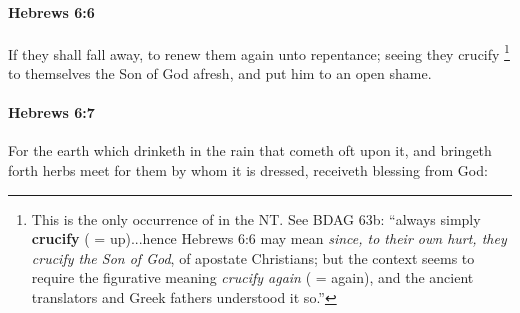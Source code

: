 		\paragraph{Hebrews 6:6} %
			\label{HEBREWS-6-6}

			If they shall fall away, to renew them again unto repentance; seeing they crucify%
				\footnote{%
					\label{ANASTAUROO}%
					This is the only occurrence of  in the NT. See BDAG 63b: ``always simply \textbf{crucify} ( = up)...hence Hebrews 6:6 may mean \textit{since, to their own hurt, they crucify the Son of God}, of apostate Christians; but the context seems to require the figurative meaning \textit{crucify again} ( = again), and the ancient translators and Greek fathers understood it so.''
					}
			to themselves the Son of God afresh, and put him to an open shame.

			\begin{framed}
			\scriptsize
				\begin{compactdesc}
					\item[SBLG] 
				\end{compactdesc}
			\end{framed}

		\paragraph{Hebrews 6:7} %
			\label{HEBREWS-6-7}

			For the earth which drinketh in the rain that cometh oft upon it, and bringeth forth herbs meet for them by whom it is dressed, receiveth blessing from God:

